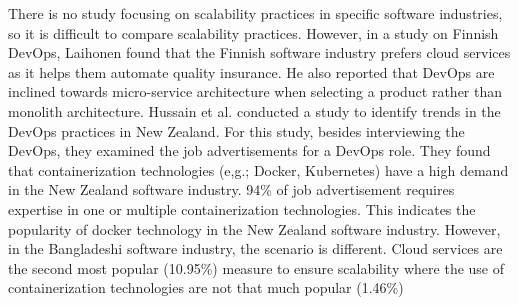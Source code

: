 There is no study focusing on scalability practices in specific software industries, so it is difficult to compare scalability practices. However, in a study on Finnish DevOps, Laihonen\cite{Laihonen2018} found that the Finnish software industry prefers cloud services as it helps them automate quality insurance. He also reported that DevOps are inclined towards micro-service architecture when selecting a product rather than monolith architecture. Hussain et al.\cite{Hussain2017} conducted a study to identify trends in the DevOps practices in New Zealand. For this study, besides interviewing the DevOps, they examined the job advertisements for a DevOps role. They found that containerization technologies (e,g.; Docker, Kubernetes) have a high demand in the New Zealand software industry. 94\% of job advertisement requires expertise in one or multiple containerization technologies. This indicates the popularity of docker technology in the New Zealand software industry. However, in the Bangladeshi software industry, the scenario is different. Cloud services are the second most popular (10.95\%)  measure to ensure scalability where the use of containerization technologies are not that much popular (1.46\%)